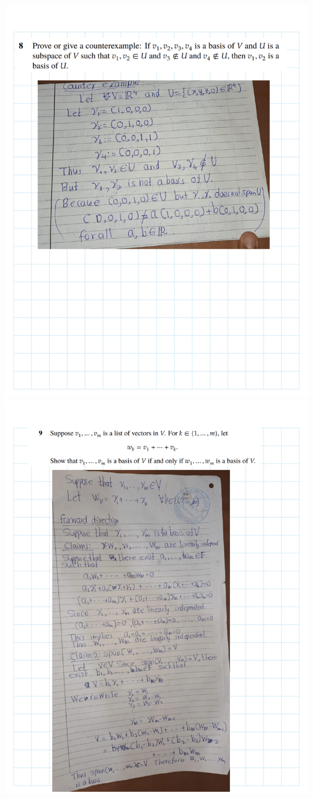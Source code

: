 \documentclass[
]{book}
\theoremstyle{definition}
\theoremstyle{definition}
\theoremstyle{definition}
\theoremstyle{definition}
\theoremstyle{remark}
\begin{document}
\includegraphics{fig/Ex 2B and 2C/EX2B (19).png}
\includegraphics{fig/Ex 2B and 2C/EX2B (20).png}
\end{document}
